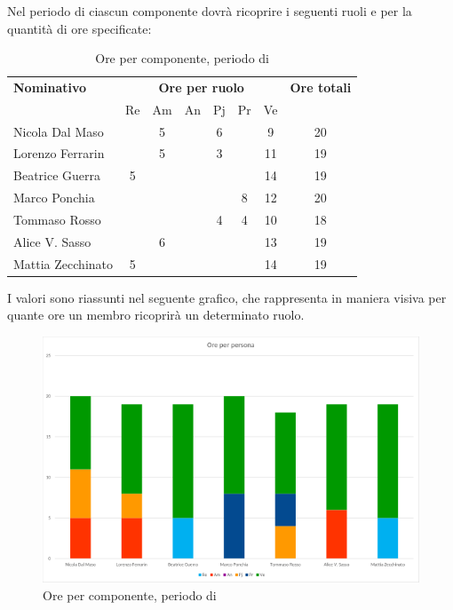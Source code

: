 \subsubsection{\VV} \label{VV}
Nel periodo di \VV{} ciascun componente dovrà ricoprire i seguenti ruoli e per la quantità di ore specificate:

\begin{table}[H]
	\centering
	\begin{tabular}{|l|c|c|c|c|c|c|c|}
		\hline
		\textbf{Nominativo} & 
		\multicolumn{6}{c|}{\textbf{Ore per ruolo}} & 
		\textbf{Ore totali} \\
		& Re & Am & An & Pj & Pr & Ve & \\
		\hline
		Nicola Dal Maso & &5 & &6 & &9 & 20 \\
		Lorenzo Ferrarin & &5 & &3 & &11 & 19 \\
		Beatrice Guerra &5 & & & & &14 & 19 \\
		Marco Ponchia & & & & &8 &12 & 20 \\
		Tommaso Rosso & & & &4 &4 &10 & 18 \\
		Alice V. Sasso & &6 & & & &13 & 19 \\
		Mattia Zecchinato &5 & & & & &14 & 19 \\
		\hline
	\end{tabular}
	\caption{Ore per componente, periodo di \VV{}}
\end{table}
I valori sono riassunti nel seguente grafico, che rappresenta in maniera visiva per quante ore un membro ricoprirà un determinato ruolo.
\begin{figure}[H]
	\centering
	\includegraphics[width=14cm]{img_suddlavoro/VV.png}
	\caption{Ore per componente, periodo di \VV{}}
\end{figure}

